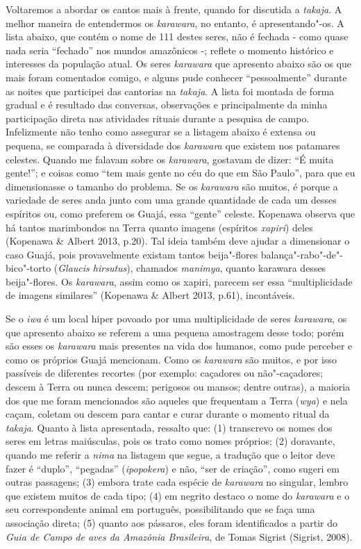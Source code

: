 Voltaremos a abordar os cantos mais à frente, quando for discutida a
\emph{takaja}. A melhor maneira de entendermos os \emph{karawara}, no
entanto, é apresentando"-os. A lista abaixo, que contém o nome de 111
destes seres, não é fechada - como quase nada seria ``fechado'' nos mundos
amazônicos -; reflete o momento histórico e interesses da população
atual. Os seres \emph{karawara} que apresento abaixo são os que mais
foram comentados comigo, e alguns pude conhecer ``pessoalmente'' durante
as noites que participei das cantorias na \emph{takaja}. A lista foi
montada de forma gradual e é resultado das conversas, observações e
principalmente da minha participação direta nas atividades rituais
durante a pesquisa de campo. Infelizmente não tenho como assegurar se a
listagem abaixo é extensa ou pequena, se comparada à diversidade dos
\emph{karawara} que existem nos patamares celestes. Quando me falavam
sobre os \emph{karawara}, gostavam de dizer: ``É muita gente!''; e
coisas como ``tem mais gente no céu do que em São Paulo'', para que eu
dimensionasse o tamanho do problema. Se os \emph{karawara} são muitos, é
porque a variedade de seres anda junto com uma grande quantidade de cada
um desses espíritos ou, como preferem os Guajá, essa ``gente'' celeste.
Kopenawa observa que há tantos marimbondos na Terra quanto imagens
(espíritos \emph{xapiri}) deles (Kopenawa \& Albert 2013, p.20). Tal
ideia também deve ajudar a dimensionar o caso Guajá, pois provavelmente
existam tantos beija"-flores balança"-rabo"-de"-bico"-torto (\emph{Glaucis
hirsutus}), chamados \emph{manimya}, quanto karawara desses
beija"-flores. Os \emph{karawara}, assim como os xapiri, parecem ser essa
``multiplicidade de imagens similares'' (Kopenawa \& Albert 2013, p.61),
incontáveis.

Se o \emph{iwa} é um local hiper povoado por uma multiplicidade de seres
\emph{karawara}, os que apresento abaixo se referem a uma pequena
amostragem desse todo; porém são esses os \emph{karawara} mais presentes
na vida dos humanos, como pude perceber e como os próprios Guajá
mencionam. Como os \emph{karawara} são muitos, e por isso passíveis de
diferentes recortes (por exemplo: caçadores ou não"-caçadores; descem à
Terra ou nunca descem; perigosos ou mansos; dentre outras), a maioria
dos que me foram mencionados são aqueles que frequentam a Terra
(\emph{wya}) e nela caçam, coletam ou descem para cantar e curar durante
o momento ritual da \emph{takaja}. Quanto à lista apresentada, ressalto
que: (1) transcrevo os nomes dos seres em letras maiúsculas, pois os
trato como nomes próprios; (2) doravante, quando me referir a
\emph{nima} na listagem que segue, a tradução que o leitor deve fazer é
``duplo'', ``pegadas'' (\emph{ipopokera}) e não, ``ser de
criação'', como sugeri em outras passagens; (3) embora trate cada espécie
de \emph{karawara} no singular, lembro que existem muitos de cada tipo;
(4) em negrito destaco o nome do \emph{karawara} e o seu correspondente
animal em português, possibilitando que se faça uma associação direta;
(5) quanto aos pássaros, eles foram identificados a partir do \emph{Guia
de Campo} \emph{de aves da Amazônia Brasileira}, de Tomas Sigrist
(Sigrist, 2008).


